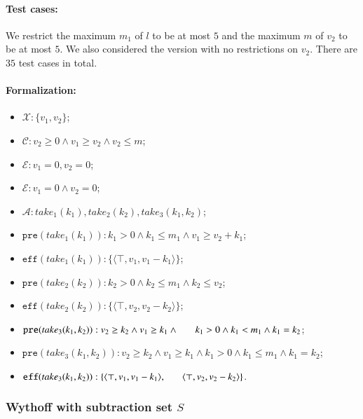 \documentclass[review]{elsarticle}
\newcommand{\set}[1]{\{ #1 \}}
\newcommand{\tuple}[1]{\langle {#1} \rangle}
\newcommand{\true}{\top}
\newcommand{\statevar}{\mathcal{X}}
\newcommand{\act}{\mathcal{A}}
\newcommand{\constraint}{\mathcal{C}}
\newcommand{\estate}{\mathcal{E}}
\newcommand{\pre}{\mathtt{pre}}
\newcommand{\eff}{\mathtt{eff}}
\begin{document}
\paragraph{Test cases:}
We restrict the maximum $m_1$ of $l$ to be at most $5$ and the maximum $m$ of $v_2$ to be at most $5$.
We also considered the version with no restrictions on $v_2$.
There are $35$ test cases in total.


\paragraph{Formalization:}
\begin{itemize}
	\item $\statevar: \set{v_1, v_2}$;
	\item $\constraint: v_2 \ge 0 \wedge  v_1 \ge v_2 \wedge v_2 \le m$;
	\item $\estate: v_1 =0, v_2 = 0$;
	\item {\color{red}$\estate: v_1 = 0 \wedge v_2 = 0$;}
	\item $\act:take_1(k_1), take_2(k_2), take_3(k_1,k_2)$;
	\item $\pre(take_1(k_1)) : k_1>0 \wedge k_1 \le m_1\wedge v_1 \ge v_2 + k_1$;  
	\item $\eff(take_1(k_1)) : \set{\tuple{\true, v_1, v_1-k_1}}$;
	\item $\pre(take_2(k_2)) : k_2>0 \wedge k_2\le m_1  \wedge k_2 \le v_2 $;
	\item $\eff(take_2(k_2)) : \set{\tuple{\true, v_2, v_2-k_2}}$;
	\item $\pre(take_3(k_1, k_2)) : v_2 \ge k_2 \wedge v_1 \ge k_1 \wedge \\ \hspace*{6mm} k_1 > 0 \wedge k_1<m_1 \wedge k_1 = k_2$;
	\item {\color{red}$\pre(take_3(k_1, k_2)) : v_2 \ge k_2 \wedge v_1 \ge k_1 \wedge k_1 > 0 \wedge k_1 \le m_1 \wedge k_1 = k_2$;}
	\item $\eff(take_3(k_1, k_2)) : \set{\tuple{\true, v_1, v_1 -k_1},\\ \hspace*{6mm} \tuple{\true, v_2, v_2 - k_2}}$.
\end{itemize}




\subsubsection{Wythoff with subtraction set $S$ \protect\cite{DucFGN2009} }
\end{document}
